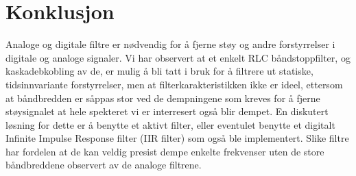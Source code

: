 \section{Konklusjon}
\label{konklusjon}

Analoge og digitale filtre er nødvendig for å fjerne støy og andre forstyrrelser i digitale og analoge signaler. Vi har observert at 
et enkelt RLC båndstoppfilter, og kaskadebkobling av de, er mulig å bli tatt i bruk for å filtrere ut statiske, tidsinnvariante forstyrrelser,
men at filterkarakteristikken ikke er ideel, ettersom at båndbredden er såppas stor ved de dempningene som kreves for å fjerne støysignalet 
at hele spekteret vi er interresert også blir dempet. En diskutert løsning for dette er å benytte et aktivt filter, eller eventulet benytte et 
digitalt Infinite Impulse Response filter (IIR filter) som også ble implementert. Slike filtre har fordelen at de kan veldig presist dempe enkelte 
frekvenser uten de store båndbreddene observert av de analoge filtrene.

